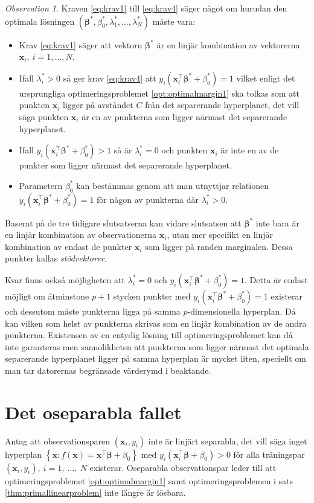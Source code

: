 \documentclass[a4paper, 12pt]{report}
\theoremstyle{definition}
\theoremstyle{remark}
\newtheorem*{rem}{Observation}
\newcommand{\bfbeta}{{\boldsymbol{\beta}}}
\begin{document}
\begin{rem}
	Kraven \ref{eq:krav1} till \ref{eq:krav4} säger något om hurudan den optimala lösningen $\left(\bfbeta^*,\beta^*_0, \lambda_1^*,\dots,\lambda_N^*\right)$ måste vara:
	\begin{itemize}
		\item Krav \ref{eq:krav1} säger att vektorn $\bfbeta^*$ är en linjär kombination av vektorerna $\mathbf{x}_i,~i=1,\dots,N$.
		\item Ifall $\lambda^*_i > 0$ så ger krav \ref{eq:krav4} att $y_i\left(\mathbf{x}_i^\intercal\bfbeta^*+\beta^*_0\right) = 1$ vilket enligt det ursprungliga optimeringsproblemet \ref{opt:optimalmargin1} ska tolkas som att punkten $\mathbf{x}_i$ ligger på avståndet $C$ från det separerande hyperplanet, det vill säga punkten $\mathbf{x}_i$ är en av punkterna som ligger närmast det separerande hyperplanet.
		\item Ifall $y_i\left(\mathbf{x}^\intercal_i\bfbeta^* + \beta^*_0\right) > 1$ så är $\lambda^*_i = 0$ och punkten $\mathbf{x}_i$ är inte en av de punkter som ligger närmast det separerande hyperplanet.
		\item Parametern $\beta^*_0$ kan bestämmas genom att man utnyttjar relationen $y_i\left( \mathbf{x}_i^\intercal \bfbeta^* + \beta^*_0\right) = 1$ för någon av punkterna där $\lambda^*_i > 0$.
	\end{itemize}
	Baserat på de tre tidigare slutsatserna kan vidare slutsatsen att $\bfbeta^*$ inte bara är en linjär kombination av observationerna $\mathbf{x}_i$, utan mer specifikt en linjär kombination av endast de punkter $\mathbf{x}_{i}$ som ligger på randen marginalen. Dessa punkter kallas \emph{stödvektorer}.
\end{rem}

Kvar finns också möjligheten att $\lambda^*_i = 0$ och $y_i\left( \mathbf{x}_i^\intercal \bfbeta^* + \beta^*_0\right) = 1$. Detta är endast möjligt om åtminstone $p+1$ stycken punkter med $y_i\left( \mathbf{x}_i^\intercal \bfbeta^* + \beta^*_0 \right) = 1$ existerar och dessutom måste punkterna ligga på samma $p$-dimensionella hyperplan. Då kan vilken som helst av punkterna skrivas som en linjär kombination av de andra punkterna. Existensen av en entydig lösning till optimeringsproblemet kan då inte garanteras men sannolikheten att punkterna som ligger närmast det optimala separerande hyperplanet ligger på samma hyperplan är mycket liten, speciellt om man tar datorernas begränsade värderymd i beaktande.

\section{Det oseparabla fallet}
Antag att observationsparen $\left(\mathbf{x}_i, y_i\right)$ inte är linjärt separabla, det vill säga inget hyperplan $\left\{\mathbf{x} : f\left(\mathbf{x}\right) = \mathbf{x}^\intercal \bfbeta + \beta_0 \right\}$ med $y_i\left(\mathbf{x}_i^\intercal\bfbeta+\beta_0\right)>0$ för alla träningspar $(\mathbf{x}_i,y_i),~i=1,~\dots,~N$ existerar. Oseparabla observationspar leder till att optimeringsproblemet \ref{opt:optimalmargin1} samt optimeringsproblemen i sats \ref{thm:primallinearproblem} inte längre är lösbara.
\end{document}
